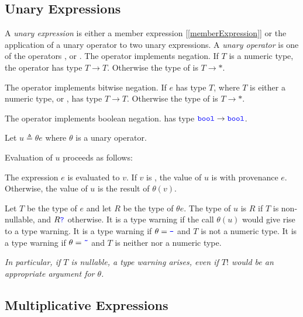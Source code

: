 \documentclass{article}
\begin{document}
\MemberExpression{}

\PrimitiveExpression{}

\subsection{\space Unary Expressions}
\label{unaryExpressions}

A {\em unary expression} is either a member expression [\ref{memberExpression}] or the application of a unary operator to two unary expressions.
A {\em unary operator} is one of the operators \MINUS, \BNOT{} or  \NOT{}. The \MINUS{} operator implements negation. If $T$ is a numeric type, the \MINUS{} operator has type $T \to T$. Otherwise the type of \MINUS is $T \to *$.

The \BNOT{} operator implements bitwise negation. If $e$ has type $T$, where $T$ is either a numeric type, \BOOL{} or \BOOL\QUESTIONMARK{},  \BNOT{} has type $T \to T$. Otherwise the type of \BNOT is $T \to *$.

The \NOT{} operator implements boolean negation. \NOT{} has type $\texttt{\color{blue} bool}{} \to \texttt{\color{blue} bool}$.


\UnaryExpression{}

Let $u \triangleq \theta{} e$ where $\theta$ is a unary operator.

Evaluation of $u$ proceeds as follows:

The expression $e$ is evaluated to $v$.  If  $v$ is \NULL{}, the value of $u$ is \NULL{} with provenance $e$. Otherwise, the value of $u$ is the result of $\theta(v)$.

Let $T$ be the type of $e$ and let $R$ be the type of $\theta{} e$. The type of $u$ is $R$ if $T$ is non-nullable, and $R\texttt{\color{blue} ?}$ otherwise. It is a type warning if the call $\theta(u)$ would give rise to a type warning. It is a type warning if $\theta = \texttt{\color{blue} -}$ and $T$ is not a numeric type.
It is a type warning if $\theta = \texttt{\color{blue} \~{}}$ and $T$ is neither \BOOL{} nor a numeric type.

{\em In particular, if $T$ is nullable, a type warning arises, even if $T!$ would be an appropriate argument for $\theta$.}



\subsection{\space Multiplicative Expressions}
\label{multiplicativeExpressions}
\end{document}
